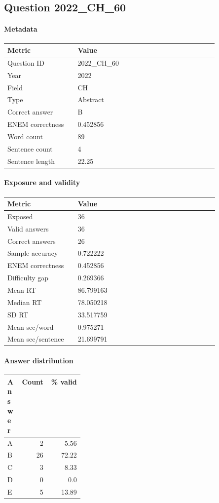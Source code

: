 \subsection*{Question 2022\_CH\_60}
\label{sec:q_2022_CH_60}
\paragraph{Metadata}
\begin{tabular}{p{0.30\linewidth}p{0.60\linewidth}}
\toprule
Metric & Value\\
\midrule
Question ID & 2022\_CH\_60\\
Year & 2022\\
Field & CH\\
Type & Abstract\\
Correct answer & B\\
ENEM correctness & 0.452856\\
Word count & 89\\
Sentence count & 4\\
Sentence length & 22.25\\
\bottomrule
\end{tabular}

\paragraph{Exposure and validity}
\begin{tabular}{p{0.30\linewidth}p{0.60\linewidth}}
\toprule
Metric & Value\\
\midrule
Exposed & 36\\
Valid answers & 36\\
Correct answers & 26\\
Sample accuracy & 0.722222\\
ENEM correctness & 0.452856\\
Difficulty gap & 0.269366\\
Mean RT & 86.799163\\
Median RT & 78.050218\\
SD RT & 33.517759\\
Mean sec/word & 0.975271\\
Mean sec/sentence & 21.699791\\
\bottomrule
\end{tabular}

\paragraph{Answer distribution}
\begin{tabular}{p{0.18\linewidth}rr}
\toprule
Answer & Count & \% valid\\
\midrule
A & 2 & 5.56\\
B & 26 & 72.22\\
C & 3 & 8.33\\
D & 0 & 0.0\\
E & 5 & 13.89\\
\bottomrule
\end{tabular}

